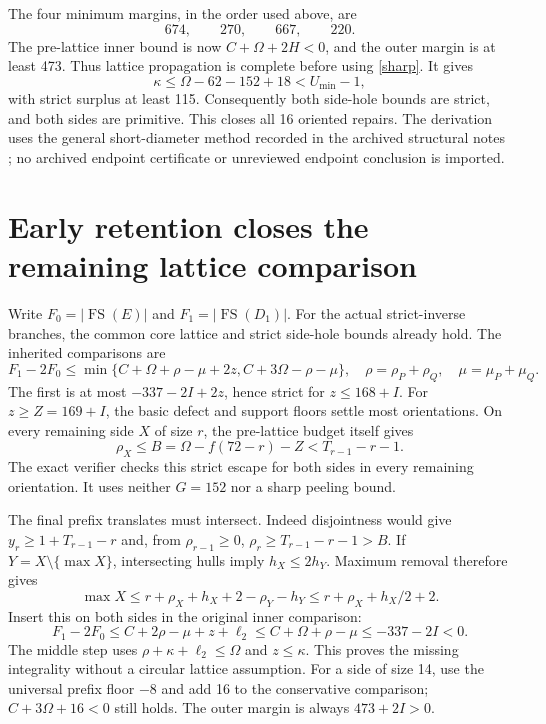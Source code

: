 \documentclass[11pt,a4paper]{article}
\newcommand{\FS}{\operatorname{FS}}\newcommand{\Z}{\mathbb Z}
\begin{document}
The four minimum margins, in the order used above, are
\[674,\qquad270,\qquad667,\qquad220.\]
The pre-lattice inner bound is now
$C+\Omega+2H<0$, and the outer margin is at least 473. Thus lattice
propagation is complete before using \eqref{sharp}. It gives
\[
 \kappa\le\Omega-62-152+18<U_{\min}-1,
\]
with strict surplus at least 115. Consequently both side-hole bounds are
strict, and both sides are primitive. This closes all 16 oriented repairs.
The derivation uses the general short-diameter method recorded in the
archived structural notes \cite{archive}; no archived endpoint certificate
or unreviewed endpoint conclusion is imported.

\section{Early retention closes the remaining lattice comparison}
Write $F_0=|\FS(E)|$ and $F_1=|\FS(D_1)|$.
For the actual strict-inverse branches, the common core lattice and strict
side-hole bounds already hold. The inherited comparisons are
\[
 F_1-2F_0\le\min\{C+\Omega+\rho-\mu+2z,
                         C+3\Omega-\rho-\mu\},
 \quad\rho=\rho_P+\rho_Q,\quad\mu=\mu_P+\mu_Q.
\]
The first is at most $-337-2I+2z$, hence strict for $z\le168+I$.
For $z\ge Z=169+I$, the basic defect and support floors settle most
orientations. On every remaining side $X$ of size $r$, the pre-lattice
budget itself gives
\[
 \rho_X\le B=\Omega-f(72-r)-Z<T_{r-1}-r-1.
\]
The exact verifier checks this strict escape for both sides in every
remaining orientation. It uses neither $G=152$ nor a sharp peeling bound.

The final prefix translates must intersect. Indeed disjointness would give
$y_r\ge1+T_{r-1}-r$ and, from $\rho_{r-1}\ge0$,
$\rho_r\ge T_{r-1}-r-1>B$. If $Y=X\setminus\{\max X\}$,
intersecting hulls imply $h_X\le2h_Y$. Maximum removal therefore gives
\[
 \max X\le r+\rho_X+h_X+2-\rho_Y-h_Y
          \le r+\rho_X+h_X/2+2.
\]
Insert this on both sides in the original inner comparison:
\[
 F_1-2F_0\le C+2\rho-\mu+z+\ell_2
 \le C+\Omega+\rho-\mu\le-337-2I<0.
\]
The middle step uses $\rho+\kappa+\ell_2\le\Omega$ and $z\le\kappa$.
This proves the missing integrality without a circular lattice assumption.
For a side of size 14, use the universal prefix floor $-8$ and add 16
to the conservative comparison; $C+3\Omega+16<0$ still holds.
The outer margin is always $473+2I>0$.
\end{document}

